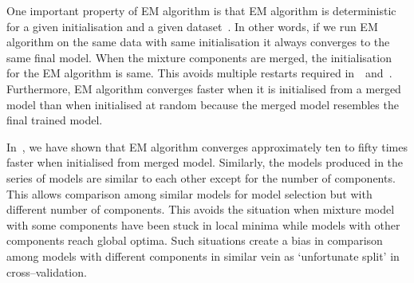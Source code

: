 One important property of EM algorithm is that EM 
algorithm is deterministic for a given initialisation and
a given dataset~\cite{McLachlan2008emext}. In other words, 
if we run EM algorithm on the same data with same 
initialisation it always converges to the same final model. 
When the mixture components are merged, the initialisation 
for the EM algorithm is same. This avoids multiple 
restarts required in~\cite{chickering1997}~and~\cite{tikka2007b}.
Furthermore, EM algorithm converges faster when it is 
initialised  from a merged model than when initialised 
at random because the merged model resembles the final
trained model. 

In~, 
we have shown that EM algorithm converges approximately 
ten to fifty times faster when initialised from  merged 
model. Similarly, the models produced in the series of models
are similar to each other except for the number of 
components. This allows comparison among similar models 
for model selection but with different number of 
components. This avoids the situation when mixture model
with some components have been stuck in local minima while 
models with other components reach global optima. 
Such situations create a bias in comparison among models with 
different components in similar vein as `unfortunate split' in 
cross--validation. 


% 









